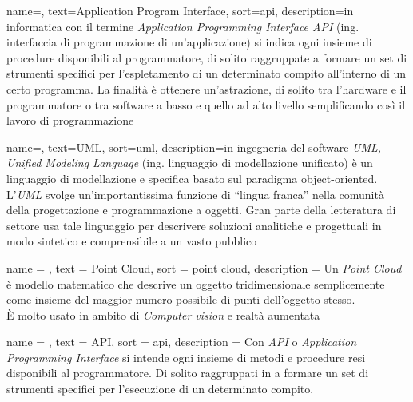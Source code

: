 
\renewcommand{\acronymname}{Acronimi e abbreviazioni}




{
    name=,
    text=Application Program Interface,
    sort=api,
    description={in informatica con il termine \emph{Application Programming Interface API} (ing. interfaccia di programmazione di un'applicazione) si indica ogni insieme di procedure disponibili al programmatore, di solito raggruppate a formare un set di strumenti specifici per l'espletamento di un determinato compito all'interno di un certo programma. La finalità è ottenere un'astrazione, di solito tra l'hardware e il programmatore o tra software a basso e quello ad alto livello semplificando così il lavoro di programmazione}
}

{
    name=,
    text=UML,
    sort=uml,
    description={in ingegneria del software \emph{UML, Unified Modeling Language} (ing. linguaggio di modellazione unificato) è un linguaggio di modellazione e specifica basato sul paradigma object-oriented. L'\emph{UML} svolge un'importantissima funzione di ``lingua franca'' nella comunità della progettazione e programmazione a oggetti. Gran parte della letteratura di settore usa tale linguaggio per descrivere soluzioni analitiche e progettuali in modo sintetico e comprensibile a un vasto pubblico}
}

 {
	name = ,
	text = Point Cloud,
	sort = point cloud,
	description = {Un \emph{Point Cloud} è modello matematico che descrive un oggetto tridimensionale semplicemente come insieme del maggior numero possibile di punti dell'oggetto stesso.\\
È molto usato in ambito di \emph{Computer vision} e realtà aumentata}
}


 {
	name = ,
	text = API,
	sort = api,
	description = {Con \emph{API} o \emph{Application Programming Interface} si intende ogni insieme di metodi e procedure resi disponibili al programmatore. Di solito raggruppati in a formare un set di strumenti specifici per l'esecuzione di un determinato compito.}
}

